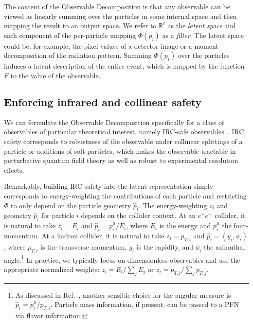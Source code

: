 \documentclass[letterpaper,11pt]{article}
\DeclareRobustCommand{\Ref}[1]{Ref.~\cite{#1}}
\begin{document}
The content of the Observable Decomposition is that any observable can be viewed as linearly summing over the particles in some internal space and then mapping the result to an output space.
%
We refer to $\mathbb R^\ell$ as the \emph{latent space} and each component of the per-particle mapping $\Phi(p_i)$ as a \emph{filter}.
%
The latent space could be, for example, the pixel values of a detector image or a moment decomposition of the radiation pattern.
%
Summing $\Phi(p_i)$ over the particles induces a latent description of the entire event, which is mapped by the function $F$ to the value of the observable.



\subsection{Enforcing infrared and collinear safety}

We can formulate the Observable Decomposition specifically for a class of observables of particular theoretical interest, namely IRC-safe observables~\cite{Kinoshita:1962ur,Lee:1964is,sterman1995handbook,Weinberg:1995mt}.
%
IRC safety corresponds to robustness of the observable under collinear splittings of a particle or additions of soft particles, which makes the observable tractable in perturbative quantum field theory as well as robust to experimental resolution effects.


Remarkably, building IRC safety into the latent representation simply corresponds to energy-weighting the contributions of each particle and restricting $\Phi$ to only depend on the particle geometry $\hat p_i$.
%
The energy-weighting $z_i$ and geometry $\hat p_i$ for particle $i$ depends on the collider context.
%
At an $e^+e^-$ collider, it is natural to take $z_i = E_i$ and $\hat p_i = p^\mu_i/E_i$, where $E_i$ is the energy and $p^\mu_i$ the four-momentum.
%
At a hadron collider, it is natural to take $z_i = p_{T,i}$ and $\hat p_i=(y_i,\phi_i)$, where $p_{T,i}$ is the transverse momentum, $y_i$ is the rapidity, and $\phi_i$ the azimuthal angle.\footnote{As discussed in \Ref{Komiske:2017aww}, another sensible choice for the angular measure is $\hat p_i = p^\mu_i/p_{T,i}$. Particle mass information, if present, can be passed to a PFN via flavor information.}
%
In practice, we typically focus on dimensionless observables and use the appropriate normalized weights: $z_i=E_i/\sum_jE_j$  or $z_i=p_{T,i}/\sum_jp_{T,j}$.
\end{document}
